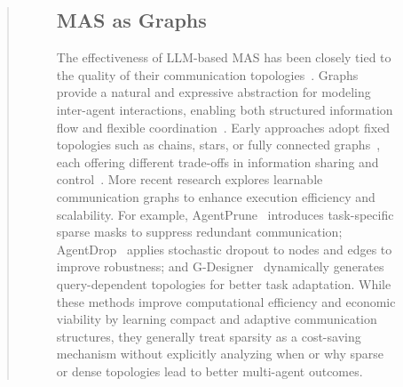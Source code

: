 \documentclass[11pt]{article}
\begin{document}
\begin{abstract}
\begin{figure}[ht!]
\subsection{MAS as Graphs}
The effectiveness of LLM-based MAS has been closely tied to the quality of their communication topologies~\cite{zhuge2024gptswarm}. Graphs provide a natural and expressive abstraction for modeling inter-agent interactions, enabling both structured information flow and flexible coordination~\cite{hu2024learning,zhou2025multi}. Early approaches adopt fixed topologies such as chains, stars, or fully connected graphs~\cite{qian2024scaling}, each offering different trade-offs in information sharing and control~\cite{li2024improving}. More recent research explores learnable communication graphs to enhance execution efficiency and scalability. For example, AgentPrune~\cite{zhang2024cut} introduces task-specific sparse masks to suppress redundant communication; AgentDrop~\cite{wang2025agentdropout} applies stochastic dropout to nodes and edges to improve robustness; and G-Designer~\cite{zhang2024g} dynamically generates query-dependent topologies for better task adaptation. While these methods improve computational efficiency and economic viability by learning compact and adaptive communication structures, they generally treat sparsity as a cost-saving mechanism without explicitly analyzing when or why sparse or dense topologies lead to better multi-agent outcomes.

\end{figure}
\end{abstract}
\end{document}
